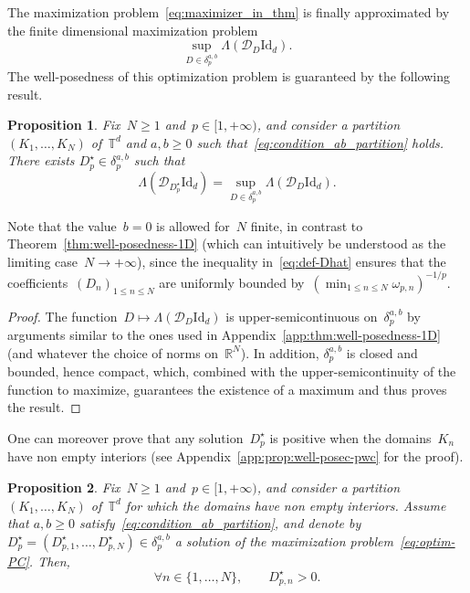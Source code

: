 \documentclass{article}
\newtheorem{proposition}{Proposition}
\newcommand{\R}{\mathbb{R}}
\newcommand{\Id}{\mathrm{Id}}
\renewcommand{\leq}{\leqslant}
\renewcommand{\geq}{\geqslant}
\def\R{\mathbb{R}}
\def\T{\mathbb{T}}
\newcommand{\Df}{\mathscr{D}}
\newcommand{\diff}{D}
\newcommand{\diffset}{\delta}
\renewcommand{\dim}{d}
\begin{document}
The maximization problem~\eqref{eq:maximizer_in_thm} is finally approximated by the finite dimensional maximization problem
\begin{equation}
  \label{eq:optim-PC}
  \sup_{\diff\in\diffset_p^{a,b}} \Lambda(\Df_\diff \Id_\dim).
\end{equation}
The well-posedness of this optimization problem is guaranteed by the following result. 

\begin{proposition}
  \label{lem:well-posed-finite-dim}
  Fix~$N \geq 1$ and~$p\in [1,+\infty)$, and consider a partition~$(K_1,\dots,K_N)$ of~$\T^\dim$ and $a,b \geq 0$ such that~\eqref{eq:condition_ab_partition} holds. There exists $\diff^{\star}_p \in \diffset_p^{a,b}$ such that
    \[
    \Lambda(\Df_{\diff_p^\star} \Id_\dim) = \sup_{\diff\in\diffset_p^{a,b}} \Lambda(\Df_\diff \Id_\dim).
    \]
\end{proposition}

Note that the value~$b=0$ is allowed for~$N$ finite, in contrast to Theorem~\eqref{thm:well-posedness-1D} (which can intuitively be understood as the limiting case~$N \to +\infty$), since the inequality in~\eqref{eq:def-Dhat} ensures that the coefficients~$(D_n)_{1 \leq n \leq N}$ are uniformly bounded by~$(\min_{1 \leq n \leq N} \omega_{p,n})^{-1/p}$.

\begin{proof}
The function~$\diff \mapsto \Lambda(\Df_\diff \Id_\dim)$ is upper-semicontinuous on~$\diffset_p^{a,b}$ by arguments similar to the ones used in Appendix~\ref{app:thm:well-posedness-1D}  (and whatever the choice of norms on~$\R^N$). In addition, $\diffset_p^{a,b}$ is closed and bounded, hence compact, which, combined with the upper-semicontinuity of the function to maximize, guarantees the existence of a maximum and thus proves the result.
\end{proof}

One can moreover prove that any solution~$\diff^{\star}_p$ is positive when the domains~$K_n$ have non empty interiors (see Appendix~\ref{app:prop:well-posec-pwc} for the proof).
    
\begin{proposition}
  \label{prop:well-posed-pwc}
  Fix~$N \geq 1$ and~$p\in [1,+\infty)$, and consider a partition~$(K_1,\dots,K_N)$ of~$\T^\dim$ for which the domains have non empty interiors. Assume that $a,b \geq 0$ satisfy~\eqref{eq:condition_ab_partition}, and denote by ${\diff}^{\star}_p = (\diff^{\star}_{p,1},\ldots,{\diff}^{\star}_{p,N})\in\diffset_p^{a,b}$ a solution of the maximization problem~\eqref{eq:optim-PC}. Then,
  \[
  \forall n\in \{1,\ldots, N\}, \qquad {\diff}^{\star}_{p,n}>0.
  \]
\end{proposition}
\end{document}
